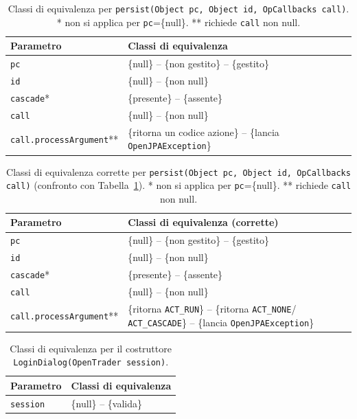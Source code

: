 \begin{table}[H]
\centering
\begin{tabularx}{\textwidth}{>{\raggedright\arraybackslash}p{} >{\raggedright\arraybackslash}X}
\toprule
Parametro & Classi di equivalenza \\
\midrule
\texttt{pc} & \{null\} -- \{non gestito\} -- \{gestito\} \\
\texttt{id} & \{null\} -- \{non null\} \\
\texttt{cascade}* & \{presente\} -- \{assente\} \\
\midrule
\texttt{call} & \{null\} -- \{non null\} \\
\texttt{call.processArgument}** & \{ritorna un codice azione\} -- \{lancia \texttt{OpenJPAException}\} \\
\bottomrule
\end{tabularx}
\caption{Classi di equivalenza per \texttt{persist(Object pc, Object id, OpCallbacks call)}.
* non si applica per \texttt{pc}=\{null\}. ** richiede \texttt{call} non null.}
\label{tab:persist-classi}
\end{table}

\begin{table}[H]
\centering
\begin{tabularx}{\textwidth}{>{\raggedright\arraybackslash}p{} >{\raggedright\arraybackslash}X}
\toprule
Parametro & Classi di equivalenza (corrette) \\
\midrule
\texttt{pc} & \{null\} -- \{non gestito\} -- \{gestito\} \\
\texttt{id} & \{null\} -- \{non null\} \\
\texttt{cascade}* & \{presente\} -- \{assente\} \\
\midrule
\texttt{call} & \{null\} -- \{non null\} \\
\texttt{call.processArgument}** & \{ritorna \texttt{ACT\_RUN}\} -- \{ritorna \texttt{ACT\_NONE}/
\texttt{ACT\_CASCADE}\} -- \{lancia \texttt{OpenJPAException}\} \\
\bottomrule
\end{tabularx}
\caption{Classi di equivalenza corrette per \texttt{persist(Object pc, Object id, OpCallbacks
call)} (confronto con Tabella~\ref{tab:persist-classi}). * non si applica per \texttt{pc}=\{null\}.
** richiede \texttt{call} non null.}
\label{tab:persist-classi-corrette}
\end{table}

\begin{table}[H]
\centering
\begin{tabularx}{\textwidth}{>{\raggedright\arraybackslash}p{} >{\raggedright\arraybackslash}X}
\toprule
Parametro & Classi di equivalenza \\
\midrule
\texttt{session} & \{null\} -- \{valida\} \\
\bottomrule
\end{tabularx}
\caption{Classi di equivalenza per il costruttore \texttt{LoginDialog(OpenTrader session)}.}
\label{tab:logindialog-costruttore-classi}
\end{table}

